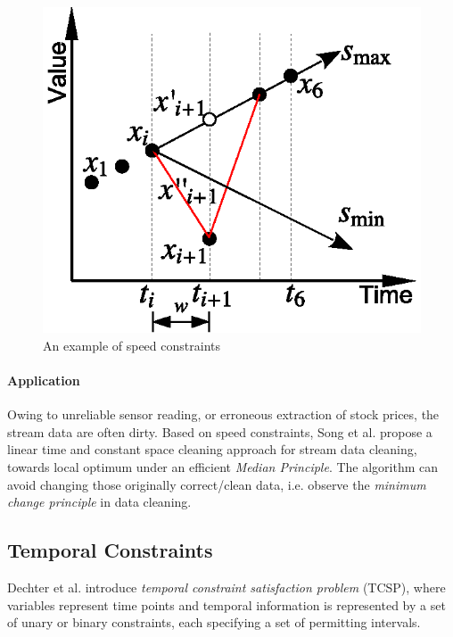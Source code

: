 \documentclass{article}
\newlength{\figwidths}
\begin{document}

\begin{figure}[t]
\centering
\includegraphics[width=0.6\figwidths]{fig/speed}%
\caption{An example of speed constraints}
\label{fig-speed}
\end{figure}


\paragraph{Application}
Owing to unreliable sensor reading, or erroneous extraction of stock prices, the stream data are often dirty.
Based on speed constraints, Song et al. propose a linear time and constant space cleaning approach for stream data cleaning,  towards local optimum under an efficient \emph{Median Principle}.
The algorithm can avoid changing those originally correct/clean data, i.e. observe the \emph{minimum change principle} in data cleaning.



\subsection{Temporal Constraints}
\label{sect-Temporal-Constraint}

Dechter et al. \cite{DBLP:journals/ai/DechterMP91} introduce \emph{temporal constraint satisfaction problem} (TCSP),
where variables represent time points and temporal information is represented by a set of unary or binary constraints, each specifying a set of permitting intervals.
\end{document}
